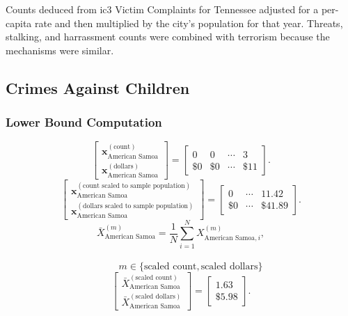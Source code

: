 \begin{table}[H]
\begin{center}
\begin{tabular}
    \bottomrule 
    \end{tabular}
    \end{center}
  \raggedright{Counts deduced from \gls{ic3} Victim Complaints for Tennessee adjusted for a per-capita rate and then multiplied by the city's  population for that year.  Threats, stalking, and harrassment counts were combined with terrorism because the mechanisms were similar.}
\end{table}
\newpage
\subsection{Crimes Against Children}
\subsubsection{Lower Bound Computation}
\[
\begin{bmatrix}
\mathbf{x}_{\text{American Samoa}}^{(\text{count})}\\
\mathbf{x}_{\text{American Samoa}}^{(\text{dollars})}
\end{bmatrix}
=
\begin{bmatrix}
0 & 0 & \cdots & 3\\
\$0 &\$0 & \cdots &\$11 
\end{bmatrix}.
\]
\[
\begin{bmatrix}
\mathbf{x}_{\text{American Samoa}}^{(\text{count scaled to sample population})}\\
\mathbf{x}_{\text{American Samoa}}^{(\text{dollars scaled to sample population})}
\end{bmatrix}
=
\begin{bmatrix}
0 & \cdots & 11.42\\
\$0 & \cdots &\$41.89
\end{bmatrix}.
\]
  \[
\bar{X}_{\text{American Samoa}}^{(m)}
= \frac{1}{N}\sum_{i=1}^{N} X_{\text{American Samoa},i}^{(m)},
\]
\\
\[
\qquad
m \in \{\text{scaled count},\text{scaled dollars}\}
\]
\[
\begin{bmatrix}
\bar{X}_{\text{American Samoa}}^{(\text{scaled count})}\\
\bar{X}_{\text{American Samoa}}^{(\text{scaled dollars})}
\end{bmatrix}
=
\begin{bmatrix}
1.63\\
\$5.98
\end{bmatrix}.
\]
